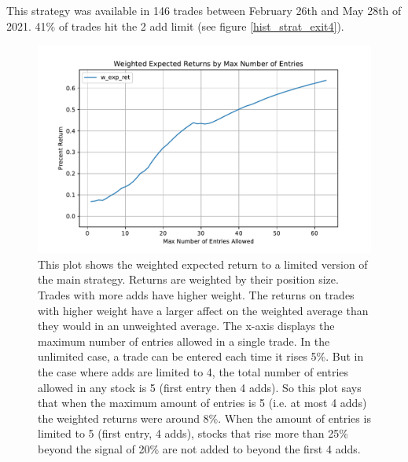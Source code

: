 \documentclass{article}
\begin{document}
This strategy was available in 146 trades between February 26th and May 28th of 2021. 41\% of trades hit the 2 add limit (see figure \ref{hist_strat_exit4}). 

\begin{figure}
	\includegraphics[width=\textwidth]{prog_entry_exit4_w_avg.pdf}
	\caption{This plot shows the weighted expected return to a limited version of the main strategy. Returns are weighted by their position size. Trades with more adds have higher weight. The returns on trades with higher weight have a larger affect on the weighted average than they would in an unweighted average. The x-axis displays the maximum number of entries allowed in a single trade. In the unlimited case, a trade can be entered each time it rises 5\%. But in the case where adds are limited to 4, the total number of entries allowed in any stock is 5 (first entry then 4 adds). So this plot says that when the maximum amount of entries is 5 (i.e. at most 4 adds) the weighted returns were around 8\%. When the amount of entries is limited to 5 (first entry, 4 adds), stocks that rise more than 25\% beyond the signal of 20\% are not added to beyond the first 4 adds.}
	\label{w_avg_strat_exit4}
	\end{figure}
\end{document}
